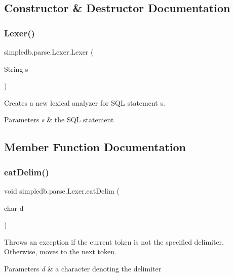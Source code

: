 \subsection{Constructor \& Destructor Documentation}
\mbox{\label{classsimpledb_1_1parse_1_1Lexer_a8c376102a2a444c7cda738ad0dce5113}} 
\subsubsection{\texorpdfstring{Lexer()}{Lexer()}}
{\footnotesize\ttfamily simpledb.\+parse.\+Lexer.\+Lexer (\begin{DoxyParamCaption}\item[{String}]{s }\end{DoxyParamCaption})\hspace{0.3cm}{\ttfamily [inline]}}

Creates a new lexical analyzer for S\+QL statement s. 
\begin{DoxyParams}{Parameters}
{\em s} & the S\+QL statement \\
\hline
\end{DoxyParams}


\subsection{Member Function Documentation}
\mbox{\label{classsimpledb_1_1parse_1_1Lexer_a85d4e04dece07a2810c5fe4560efbed1}} 
\subsubsection{\texorpdfstring{eat\+Delim()}{eatDelim()}}
{\footnotesize\ttfamily void simpledb.\+parse.\+Lexer.\+eat\+Delim (\begin{DoxyParamCaption}\item[{char}]{d }\end{DoxyParamCaption})\hspace{0.3cm}{\ttfamily [inline]}}

Throws an exception if the current token is not the specified delimiter. Otherwise, moves to the next token. 
\begin{DoxyParams}{Parameters}
{\em d} & a character denoting the delimiter \\
\hline
\end{DoxyParams}
\mbox{\label{classsimpledb_1_1parse_1_1Lexer_a3c57900b25a12edc2c8542e62f101f0f}} 
